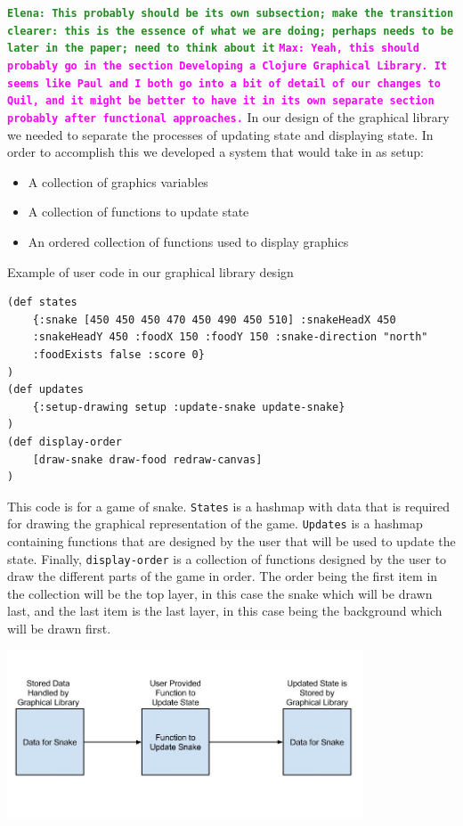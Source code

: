 \documentclass[12pt]{article}
\newcommand{\comment}[1]{{\bf \tt  {#1}}}
\newcommand{\emcomment}[1]{\textcolor{ForestGreen}{\comment{Elena: {#1}}}}
\newcommand{\mmcomment}[1]{\textcolor{magenta}{\comment{Max: {#1}}}}
\begin{document}
\emcomment{This probably should be its own subsection; make the transition clearer: this is the essence of what we are doing; perhaps needs to be later in the paper; need to think about it}
\mmcomment{Yeah, this should probably go in the section Developing a Clojure Graphical Library. It seems like Paul and I both go into a bit of detail of our changes to Quil, and it might be better to have it in its own separate section probably after functional approaches.}
In our design of the graphical library we needed to separate the processes of updating state and displaying state. In order to accomplish this we developed a system that would take in as setup:
\begin{itemize}
	\item A collection of graphics variables
	\item A collection of functions to update state
	\item An ordered collection of functions used to display graphics
\end{itemize}
Example of user code in our graphical library design
\begin{verbatim}
(def states 
	{:snake [450 450 450 470 450 490 450 510] :snakeHeadX 450 
	:snakeHeadY 450 :foodX 150 :foodY 150 :snake-direction "north" 
	:foodExists false :score 0}
)
(def updates
	{:setup-drawing setup :update-snake update-snake}
)
(def display-order
	[draw-snake draw-food redraw-canvas]
)
\end{verbatim}
This code is for a game of snake. \texttt{States} is a hashmap with data that is required for drawing the graphical representation of the game. \texttt{Updates} is a hashmap containing functions that are designed by the user that will be used to update the state. Finally, \texttt{display-order} is a collection of functions designed by the user to draw the different parts of the game in order. The order being the first item in the collection will be the top layer, in this case the snake which will be drawn last, and the last item is the last layer, in this case being the background which will be drawn first.

\includegraphics[width=300pt]{Handling_State_in_Graphical_Library}
  
\end{document}
